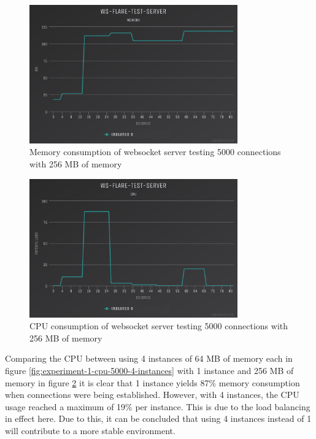 \begin{figure}[H]
  \centering
    \includegraphics[width=0.8\textwidth]{figures/experiments/experiment-1/node-js/memory-5000-256-memory.png}
    \caption{Memory consumption of websocket server testing 5000 connections with 256 MB of memory}
    \label{fig:experiment-1-memory-5000-1-instances-256-mem}
\end{figure}

\begin{figure}[H]
  \centering
    \includegraphics[width=0.8\textwidth]{figures/experiments/experiment-1/node-js/cpu-5000-256-memory.png}
    \caption{CPU consumption of websocket server testing 5000 connections with 256 MB of memory}
    \label{fig:experiment-1-cpu-5000-1-instances-256-mem}
\end{figure}

Comparing the CPU between using 4 instances of 64 MB of memory each in figure \ref{fig:experiment-1-cpu-5000-4-instances} with 1 instance and 256 MB of memory in figure \ref{fig:experiment-1-cpu-5000-1-instances-256-mem} it is clear that 1 instance yields 87\% memory consumption when connections were being established. However, with 4 instances, the CPU usage reached a maximum of 19\% per instance. This is due to the load balancing in effect here. Due to this, it can be concluded that using 4 instances instead of 1 will contribute to a more stable environment. 

